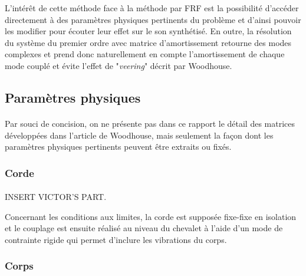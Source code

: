 \documentclass[a4paper,10pt]{article}
\begin{document}
  L'intérêt de cette méthode face à la méthode par FRF est la possibilité
d'accéder directement à des paramètres physiques pertinents du problème et
d'ainsi pouvoir les modifier pour écouter leur effet sur le son synthétisé.
  En outre, la résolution du système du premier ordre avec matrice
d'amortissement retourne des modes complexes et prend donc naturellement en
compte l'amortissement de chaque mode couplé et évite l'effet de
"\emph{veering}" décrit par Woodhouse.

\subsection{Paramètres physiques}

\paragraph{}
  Par souci de concision, on ne présente pas dans ce rapport le détail des
matrices développées dans l'article de Woodhouse, mais seulement la façon dont
les paramètres physiques pertinents peuvent être extraits ou fixés.

\subsubsection{Corde}
  \paragraph{}
  \begin{huge}
    INSERT VICTOR'S PART.
  \end{huge}
  

  Concernant les conditions aux limites, la corde est supposée fixe-fixe
en isolation et le couplage est ensuite réalisé au niveau du chevalet à l'aide
d'un mode de contrainte rigide qui permet d'inclure les vibrations du corps.

\subsubsection{Corps}
\end{document}
